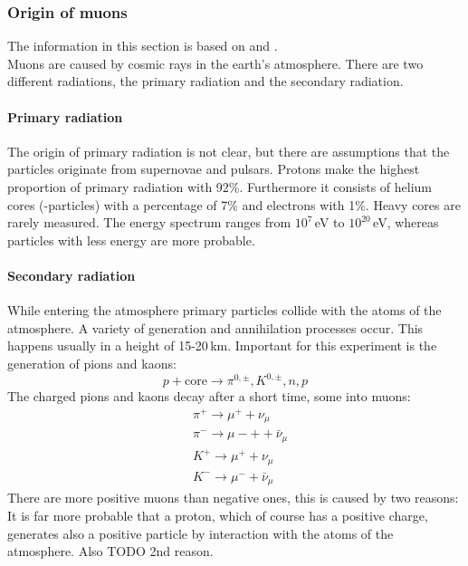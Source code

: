 \subsubsection{Origin of muons}
The information in this section is based on \cite{kosmische-strahlung} and \cite{staatsex}.\\
Muons are caused by cosmic rays in the earth's atmosphere. There are two different radiations, the primary radiation and the secondary radiation.
\paragraph{Primary radiation}
The origin of primary radiation is not clear, but there are assumptions that the particles originate from supernovae and pulsars.
Protons make the highest proportion of primary radiation with 92\%. Furthermore it consists of helium cores (\textalpha-particles) with a percentage 
of 7\% and electrons with 1\%. Heavy cores are rarely measured. The energy spectrum ranges from $10^7$\,eV to $10^{20}$\,eV, whereas particles with 
less energy are more probable.
\paragraph{Secondary radiation}
While entering the atmosphere primary particles collide with the atoms of the atmosphere. A variety of generation and annihilation processes occur. 
This happens usually in a height of 15-20\,km.
Important for this experiment is the generation of pions and kaons:
\begin{equation}
    p + \text{core} \rightarrow \pi^{0, \pm}, K^{0, \pm}, n, p
\end{equation}
The charged pions and kaons decay after a short time, some into muons:
\begin{equation}
    \begin{split}
        & \pi^+ \rightarrow \mu^+ + \nu_\mu \\
        & \pi^- \rightarrow \mu-+ + \bar{\nu}_\mu \\
        & K^+ \rightarrow \mu^+ + \nu_\mu \\
        & K^- \rightarrow \mu^- + \bar{\nu}_\mu
    \end{split}
\end{equation}
There are more positive muons than negative ones, this is caused by two reasons: It is far more probable that a proton, which of course has 
a positive charge, generates also a positive particle by interaction with the atoms of the atmosphere. Also TODO 2nd reason. %
